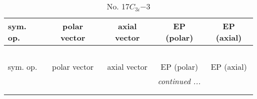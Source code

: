 \documentclass[fleqn,10pt,landscape]{jsarticle}
\begin{document}
\newpage
\begin{center}
\renewcommand{\arraystretch}{1.3}
\begin{longtable}{lcccc}
\caption{No. 17\quad$C_{3i}$\quad$-3$\quad[ trigonal ]}
 \\
 \hline \hline
sym. op. & polar vector & axial vector & EP (polar) & EP (axial) \\ \hline \endfirsthead

\multicolumn{4}{l}{\tablename\ \thetable{}} \\
 \hline \hline
sym. op. & polar vector & axial vector & EP (polar) & EP (axial) \\ \hline \endhead

 \hline \hline
\multicolumn{4}{r}{\footnotesize\it continued ...} \\ \endfoot

 \hline \hline
\multicolumn{4}{r}{} \\ \endlastfoot


\end{longtable}
\end{center}
\end{document}
